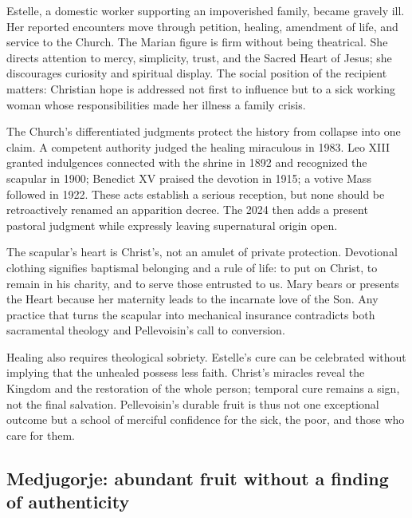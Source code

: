 Estelle, a domestic worker supporting an impoverished family, became gravely ill. Her reported encounters move through petition, healing, amendment of life, and service to the Church. The Marian figure is firm without being theatrical. She directs attention to mercy, simplicity, trust, and the Sacred Heart of Jesus; she discourages curiosity and spiritual display. The social position of the recipient matters: Christian hope is addressed not first to influence but to a sick working woman whose responsibilities made her illness a family crisis.

The Church's differentiated judgments protect the history from collapse into one claim. A competent authority judged the healing miraculous in 1983. Leo XIII granted indulgences connected with the shrine in 1892 and recognized the scapular in 1900; Benedict XV praised the devotion in 1915; a votive Mass followed in 1922. These acts establish a serious reception, but none should be retroactively renamed an apparition decree. The 2024  then adds a present pastoral judgment while expressly leaving supernatural origin open.

The scapular's heart is Christ's, not an amulet of private protection. Devotional clothing signifies baptismal belonging and a rule of life: to put on Christ, to remain in his charity, and to serve those entrusted to us. Mary bears or presents the Heart because her maternity leads to the incarnate love of the Son. Any practice that turns the scapular into mechanical insurance contradicts both sacramental theology and Pellevoisin's call to conversion.

Healing also requires theological sobriety. Estelle's cure can be celebrated without implying that the unhealed possess less faith. Christ's miracles reveal the Kingdom and the restoration of the whole person; temporal cure remains a sign, not the final salvation. Pellevoisin's durable fruit is thus not one exceptional outcome but a school of merciful confidence for the sick, the poor, and those who care for them.

\subsection{Medjugorje: abundant fruit without a finding of authenticity}


